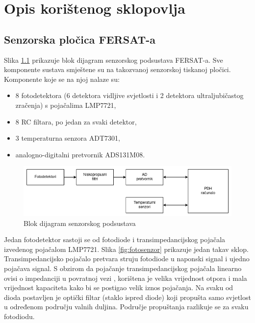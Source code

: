 \chapter{Opis korištenog sklopovlja} \label{chapter:sklopovlje}

\section{Senzorska pločica FERSAT-a}
Slika \ref{fig:sensor_board_blok} prikazuje blok dijagram senzorskog podsustava FERSAT-a. Sve komponente sustava smještene su na takozvanoj senzorskoj tiskanoj pločici. Komponente koje se na njoj nalaze su:
\begin{itemize}
    \item 8 fotodetektora (6 detektora vidljive svjetlosti i 2 detektora ultraljubičastog zračenja) s pojačalima LMP7721,
    \item 8 RC filtara, po jedan za svaki detektor,
    \item 3 temperaturna senzora ADT7301,
    \item analogno-digitalni pretvornik ADS131M08.
\end{itemize}

\begin{figure}[htb]
    \centering
    \includegraphics[width=\textwidth]{slike/sensor_board_blok.png}
    \caption{Blok dijagram senzorskog podsustava}
    \label{fig:sensor_board_blok}
\end{figure}

Jedan fotodetektor sastoji se od fotodiode i transimpedancijskog pojačala izvedenog pojačalom LMP7721. Slika \ref{fig:fotosenzor} prikazuje jedan takav sklop. Transimpedancijsko pojačalo pretvara struju fotodiode u naponski signal i ujedno pojačava signal. S obzirom da pojačanje transimpedancijskog pojačala linearno ovisi o impedanciji u povratnoj vezi \cite{lmp7721_datasheet}, korištena je velika vrijednost otpora i mala vrijednost kapaciteta kako bi se postigao velik iznos pojačanja. Na svaku od dioda postavljen je optički filtar (staklo ispred diode) koji propušta samo svjetlost u određenom području valnih duljina. Područje propuštanja razlikuje se za svaku fotodiodu.

